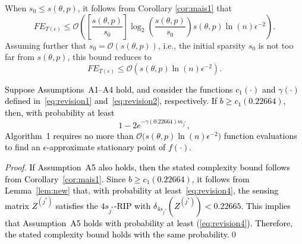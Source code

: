 \noindent When $s_{0}\leq s(\theta,p)$, it follows from Corollary \ref{cor:mais1} that 
\begin{equation*}
FE_{T(\epsilon)}\leq\mathcal{O}\left(\left[\dfrac{s(\theta,p)}{s_{0}}\right]\log_{2}\left(\dfrac{s(\theta,p)}{s_{0}}\right)s(\theta,p)\ln(n)\epsilon^{-2}\right).
\end{equation*}
Assuming further that $s_0 = \mathcal{O}(s(\theta,p))$, i.e., the initial sparsity $s_0$ is not too far from $s(\theta,p)$, this bound reduces to 
\begin{equation}
FE_{T(\epsilon)}\leq\mathcal{O}\left(s(\theta,p)\ln(n)\epsilon^{-2}\right).
\label{eq:revision3}
\end{equation}
\textcolor{black}{
\begin{corollary}
Suppose Assumptions~A1--A4 hold, and consider the functions \( c_1(\cdot) \) and \( \gamma(\cdot) \) defined in~\eqref{eq:revision1} and~\eqref{eq:revision2}, respectively. If \( b \geq c_1(0.22664) \), then, with probability at least
\begin{equation}
1 - 2 e^{-\gamma(0.22664) m_{j^{*}}},
\label{eq:revision4}
\end{equation}
Algorithm~1 requires no more than \(\mathcal{O}\bigl(s(\theta,p) \ln(n) \epsilon^{-2}\bigr)\) function evaluations to find an \(\epsilon\)-approximate stationary point of \( f(\cdot) \).
\end{corollary}
}

\begin{proof}
\textcolor{black}{If Assumption~A5 also holds, then the stated complexity bound follows from Corollary~\ref{cor:mais1}. Since \( b \geq c_1(0.22664) \), it follows from Lemma~\ref{lem:new} that, with probability at least~\eqref{eq:revision4}, the sensing matrix \( Z^{(j^{*})} \) satisfies the \( 4s_{j^{*}} \)-RIP with \( \delta_{4s_{j^{*}}}(Z^{(j^{*})}) < 0.22665 \). This implies that Assumption~A5 holds with probability at least (\ref{eq:revision4}). Therefore, the stated complexity bound holds with the same probability.}\qed
\end{proof}

